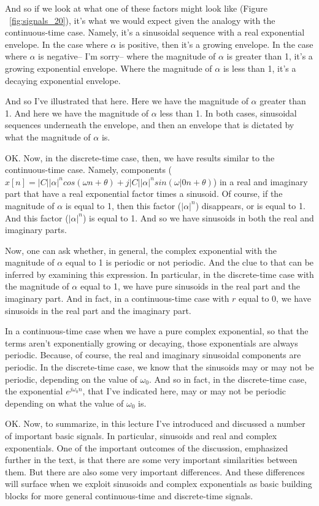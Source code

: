 \documentclass[fleqn,10pt]{olplainarticle}
\theoremstyle{definition}
\theoremstyle{remark}
\begin{document}
And so if we look at what one of these factors might look like (Figure ~\ref{fig:signals_20}), it's what we would expect given the analogy with the continuous-time case. Namely, it's a sinusoidal sequence with a real exponential envelope. In the case where $\alpha$ is positive, then it's a growing envelope. In the case where $\alpha$ is negative-- I'm sorry-- where the magnitude of $\alpha$ is greater than 1, it's a growing exponential envelope. Where the magnitude of $\alpha$ is less than 1, it's a decaying exponential envelope.

And so I've illustrated that here. Here we have the magnitude of $\alpha$ greater than 1. And here we have the magnitude of $\alpha$ less than 1. In both cases, sinusoidal sequences underneath the envelope, and then an envelope that is dictated by what the magnitude of $\alpha$ is.

OK. Now, in the discrete-time case, then, we have results similar to the continuous-time case. Namely, components ($x[n]=|C||\alpha|^n cos(\omega n+\theta) + j |C| |\alpha|^n sin(\omega|0n + \theta)$) in a real and imaginary part that have a real exponential factor times a sinusoid. Of course, if the magnitude of $\alpha$ is equal to 1, then this factor ($|\alpha|^n$) disappears, or is equal to 1. And this factor ($|\alpha|^n$) is equal to 1. And so we have sinusoids in both the real and imaginary parts.

Now, one can ask whether, in general, the complex exponential with the magnitude of $\alpha$ equal to 1 is periodic or not periodic. And the clue to that can be inferred by examining this expression. In particular, in the discrete-time case with the magnitude of $\alpha$ equal to 1, we have pure sinusoids in the real part and the imaginary part. And in fact, in a continuous-time case with $r$ equal to 0, we have sinusoids in the real part and the imaginary part.

In a continuous-time case when we have a pure complex exponential, so that the terms aren't exponentially growing or decaying, those exponentials are always periodic. Because, of course, the real and imaginary sinusoidal components are periodic. In the discrete-time case, we know that the sinusoids may or may not be periodic, depending on the value of $\omega_0$. And so in fact, in the discrete-time case, the exponential $e^{j\omega_0n}$, that I've indicated here, may or may not be periodic depending on what the value of $\omega_0$ is.

OK. Now, to summarize, in this lecture I've introduced and discussed a number of important basic signals. In particular, sinusoids and real and complex exponentials. One of the important outcomes of the discussion, emphasized further in the text, is that there are some very important similarities between them. But there are also some very important differences. And these differences will surface when we exploit sinusoids and complex exponentials as basic building blocks for more general continuous-time and discrete-time signals.
\end{document}

